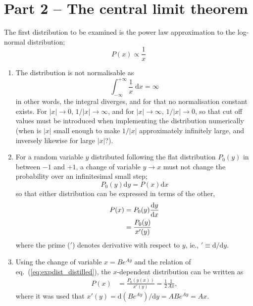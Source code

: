 \documentclass[a4paper,11pt]{article}
\newcommand{\diff}{\ensuremath{\; \text{d}}}
\newcommand{\diffd}{\ensuremath{\text{d}}}
\begin{document}
\section{Part 2 -- The central limit theorem}
The first distribution to be examined is the power law approximation to the log-normal distribution;
\begin{equation}
    P(x) \propto \frac{1}{x}
    \label{eq:powerlawdist}
\end{equation}

\begin{enumerate}
    \item The distribution is not normalisable as
        \begin{equation}
            \int_{-\infty}^{+\infty} \frac{1}{x} \diff x = \infty
            \label{eq:diverging_dist}
        \end{equation}
        in other words, the integral diverges, and for that no normalisation constant exists. For $|x| \to 0$, $1/|x| \to \infty$, and for $|x| \to \infty$, $1/|x| \to 0$, so that cut off values must be introduced when implementing the distribution numerically (when is $|x|$ small enough to make $1/|x|$ approximately infinitely large, and inversely likewise for large $|x|$?).

    \item For a random variable $y$ distributed following the flat distribution $P_0(y)$ in between $-1$ and $+1$, a change of variable $y \to x$ must not change the probability over an infinitesimal small step;
        \begin{equation}
            P_0(y) \diffd y = P(x) \diffd x
            \label{eq:consv_prob}
        \end{equation}
        so that either distribution can be expressed in terms of the other,
        \begin{align}
            P(x) &= P_0(y) \frac{\diffd y}{\diffd x} \notag \\
            &= \frac{P_0(y)}{x'(y)}
            \label{eq:expdist_distilled}
        \end{align}
        where the prime ($'$) denotes derivative with respect to $y$, ie., $' \equiv \diffd / \diffd y$. 

    \item Using the change of variable $x = Be^{Ay}$ and the relation of eq.~(\ref{eq:expdist_distilled}), the $x$-dependent distribution can be written as
        \begin{align}
            P(x) &= \frac{P_0(y(x))}{x'(y)} = \frac{1}{2} \frac{1}{Ax},
            \label{eq:px}
        \end{align}
        where it was used that $x'(y) = \diffd (Be^{Ay})/\diffd y = ABe^{Ay} = Ax$. 


\end{enumerate}
\end{document}
